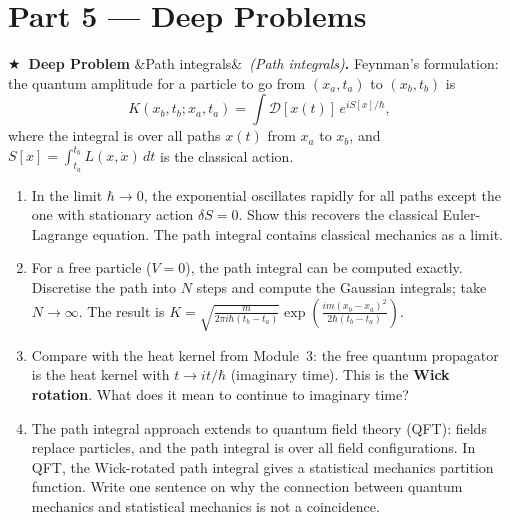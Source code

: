 \documentclass[12pt,a4paper]{article}
\newcounter{problem}
\newcounter{deepproblem}
\newenvironment{deepproblem}[1][]{\refstepcounter{deepproblem}\par\vspace{6pt}\noindent\textbf{\color{NavyBlue}$\bigstar$\ Deep Problem \thedeepproblem}\ifx&#1&\else\ \textit{(#1)}\fi\textbf{.}\enskip}{\par\vspace{4pt}}
\begin{document}
\section{Part 5 \texorpdfstring{---}{--} Deep Problems}

\begin{deepproblem}[Path integrals]
Feynman's formulation: the quantum amplitude for a particle to go from $(x_a,t_a)$ to $(x_b,t_b)$ is
\[
  K(x_b,t_b;x_a,t_a) = \int\mathcal{D}[x(t)]\,e^{iS[x]/\hbar},
\]
where the integral is over all paths $x(t)$ from $x_a$ to $x_b$, and $S[x]=\int_{t_a}^{t_b}L(x,\dot x)\,dt$ is the classical action.
\begin{enumerate}[label=(\alph*)]
  \item In the limit $\hbar\to 0$, the exponential oscillates rapidly for all paths except the one with stationary action $\delta S=0$. Show this recovers the classical Euler-Lagrange equation. The path integral contains classical mechanics as a limit.
  \item For a free particle ($V=0$), the path integral can be computed exactly. Discretise the path into $N$ steps and compute the Gaussian integrals; take $N\to\infty$. The result is $K = \sqrt{\frac{m}{2\pi i\hbar(t_b-t_a)}}\exp\left(\frac{im(x_b-x_a)^2}{2\hbar(t_b-t_a)}\right)$.
  \item Compare with the heat kernel from Module~3: the free quantum propagator is the heat kernel with $t\to it/\hbar$ (imaginary time). This is the \textbf{Wick rotation}. What does it mean to continue to imaginary time?
  \item The path integral approach extends to quantum field theory (QFT): fields replace particles, and the path integral is over all field configurations. In QFT, the Wick-rotated path integral gives a statistical mechanics partition function. Write one sentence on why the connection between quantum mechanics and statistical mechanics is not a coincidence.
\end{enumerate}
\end{deepproblem}
\end{document}
